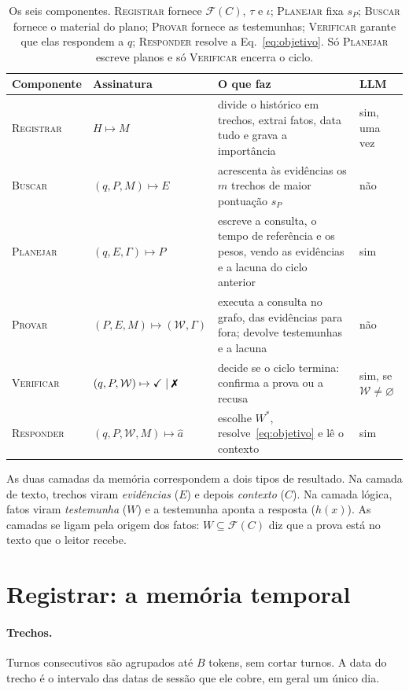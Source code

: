 \documentclass[11pt]{article}
\theoremstyle{definition}
\theoremstyle{plain}
\newcommand{\op}[1]{\textsc{#1}}
\newcommand{\F}{\mathcal{F}}          %
\newcommand{\W}{\mathcal{W}}          %
\newcommand{\ok}{\checkmark}
\begin{document}
\begin{table}[H]
\centering
\small
\begin{tabularx}{\textwidth}{@{}l l Y l@{}}
\toprule
Componente & Assinatura & O que faz & LLM \\
\midrule
\op{Registrar} & $H\mapsto M$ & divide o histórico em trechos, extrai fatos, data tudo e grava a importância & sim, uma vez \\
\op{Buscar} & $(q,P,M)\mapsto E$ & acrescenta às evidências os $m$ trechos de maior pontuação $s_P$ & não \\
\op{Planejar} & $(q,E,\Gamma)\mapsto P$ & escreve a consulta, o tempo de referência e os pesos, vendo as evidências e a lacuna do ciclo anterior & sim \\
\op{Provar} & $(P,E,M)\mapsto(\W,\Gamma)$ & executa a consulta no grafo, das evidências para fora; devolve testemunhas e a lacuna & não \\
\op{Verificar} & $(q,P,\W)\mapsto\ok\mid\text{\ding{55}}$ & decide se o ciclo termina: confirma a prova ou a recusa & sim, se $\W\neq\varnothing$ \\
\op{Responder} & $(q,P,\W,M)\mapsto\hat a$ & escolhe $W^\ast$, resolve~\eqref{eq:objetivo} e lê o contexto & sim \\
\bottomrule
\end{tabularx}
\caption{Os seis componentes. \op{Registrar} fornece $\F(C)$, $\tau$ e
$\iota$; \op{Planejar} fixa $s_P$; \op{Buscar} fornece o material do plano;
\op{Provar} fornece as testemunhas; \op{Verificar} garante que elas respondem
a $q$; \op{Responder} resolve a Eq.~\eqref{eq:objetivo}. Só \op{Planejar}
escreve planos e só \op{Verificar} encerra o ciclo.}
\label{tab:componentes}
\end{table}

As duas camadas da memória correspondem a dois tipos de resultado. Na camada
de texto, trechos viram \emph{evidências} ($E$) e depois \emph{contexto}
($C$). Na camada lógica, fatos viram \emph{testemunha} ($W$) e a testemunha
aponta a resposta ($h(x)$). As camadas se ligam pela origem dos fatos:
$W\subseteq\F(C)$ diz que a prova está no texto que o leitor recebe.

\section{Registrar: a memória temporal}
\label{sec:registrar}

\paragraph{Trechos.} Turnos consecutivos são agrupados até $B$ tokens, sem
cortar turnos. A data do trecho é o intervalo das datas de sessão que ele
cobre, em geral um único dia.
\end{document}

